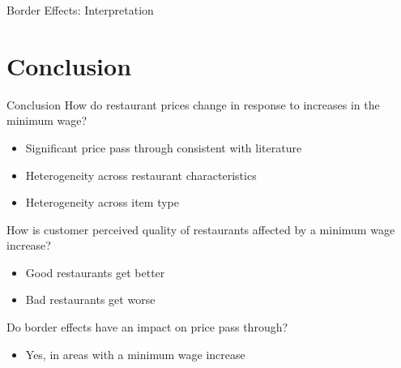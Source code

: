 \documentclass[xcolor=table]{beamer}
\begin{document}
\begin{spacing}{1.2}
\begin{frame}{Border Effects: Interpretation}
\end{frame}

\section{Conclusion}

\begin{frame}{Conclusion}
 How do restaurant prices change in response to increases in the minimum wage?
\begin{itemize}
\item Significant price pass through consistent with literature
\item Heterogeneity across restaurant characteristics
\item Heterogeneity across item type
\end{itemize}
 How is customer perceived quality of restaurants affected by a minimum wage increase?
\begin{itemize}
\item Good restaurants get better
\item Bad restaurants get worse
\end{itemize}
 Do border effects have an impact on price pass through?
\begin{itemize}
\item Yes, in areas with a minimum wage increase
\end{itemize}
\end{frame}





\end{spacing}
\end{document}
